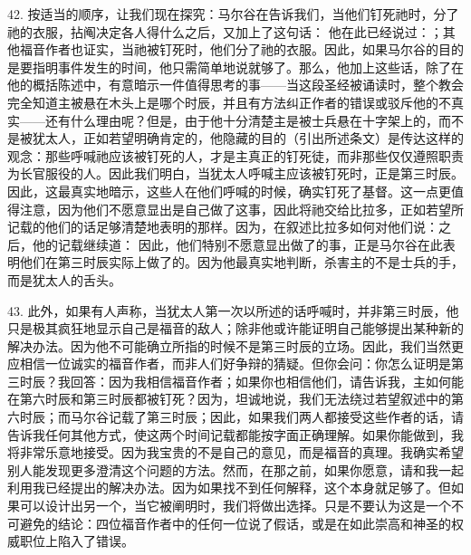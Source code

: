 42. 按适当的顺序，让我们现在探究：马尔谷在告诉我们，当他们钉死祂时，分了祂的衣服，拈阄决定各人得什么之后，又加上了这句话： 他在此已经说过：；其他福音作者也证实，当祂被钉死时，他们分了祂的衣服。因此，如果马尔谷的目的是要指明事件发生的时间，他只需简单地说就够了。那么，他加上这些话，除了在他的概括陈述中，有意暗示一件值得思考的事——当这段圣经被诵读时，整个教会完全知道主被悬在木头上是哪个时辰，并且有方法纠正作者的错误或驳斥他的不真实——还有什么理由呢？但是，由于他十分清楚主是被士兵悬在十字架上的，而不是被犹太人，正如若望明确肯定的，他隐藏的目的（引出所述条文）是传达这样的观念：那些呼喊祂应该被钉死的人，才是主真正的钉死徒，而非那些仅仅遵照职责为长官服役的人。因此我们明白，当犹太人呼喊主应该被钉死时，正是第三时辰。因此，这最真实地暗示，这些人在他们呼喊的时候，确实钉死了基督。这一点更值得注意，因为他们不愿意显出是自己做了这事，因此将祂交给比拉多，正如若望所记载的他们的话足够清楚地表明的那样。因为，在叙述比拉多如何对他们说：之后，他的记载继续道： 因此，他们特别不愿意显出做了的事，正是马尔谷在此表明他们在第三时辰实际上做了的。因为他最真实地判断，杀害主的不是士兵的手，而是犹太人的舌头。\par

43. 此外，如果有人声称，当犹太人第一次以所述的话呼喊时，并非第三时辰，他只是极其疯狂地显示自己是福音的敌人；除非他或许能证明自己能够提出某种新的解决办法。因为他不可能确立所指的时候不是第三时辰的立场。因此，我们当然更应相信一位诚实的福音作者，而非人们好争辩的猜疑。但你会问：你怎么证明是第三时辰？我回答：因为我相信福音作者；如果你也相信他们，请告诉我，主如何能在第六时辰和第三时辰都被钉死？因为，坦诚地说，我们无法绕过若望叙述中的第六时辰；而马尔谷记载了第三时辰；因此，如果我们两人都接受这些作者的话，请告诉我任何其他方式，使这两个时间记载都能按字面正确理解。如果你能做到，我将非常乐意地接受。因为我宝贵的不是自己的意见，而是福音的真理。我确实希望别人能发现更多澄清这个问题的方法。然而，在那之前，如果你愿意，请和我一起利用我已经提出的解决办法。因为如果找不到任何解释，这个本身就足够了。但如果可以设计出另一个，当它被阐明时，我们将做出选择。只是不要认为这是一个不可避免的结论：四位福音作者中的任何一位说了假话，或是在如此崇高和神圣的权威职位上陷入了错误。\par

